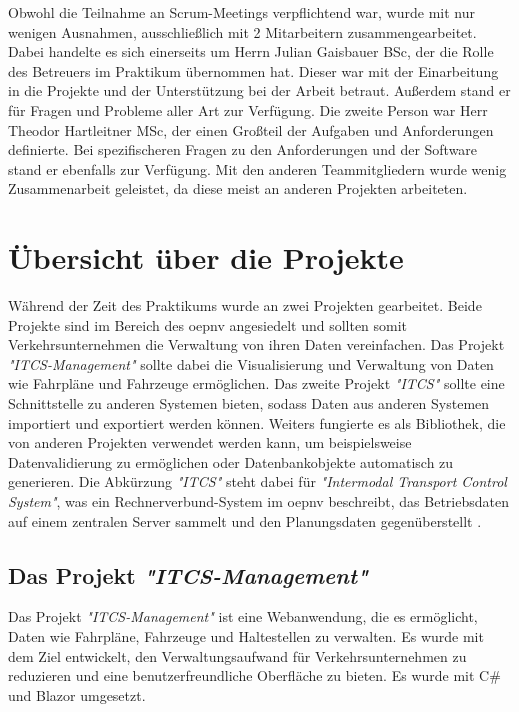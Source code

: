     Obwohl die Teilnahme an Scrum-Meetings verpflichtend war, wurde mit nur wenigen Ausnahmen, ausschließlich mit 2 Mitarbeitern zusammengearbeitet. Dabei handelte es sich einerseits um Herrn Julian Gaisbauer 
    BSc, der die Rolle des Betreuers im Praktikum übernommen hat. Dieser war mit der Einarbeitung in die Projekte und der Unterstützung bei der Arbeit betraut. Außerdem stand er für 
    Fragen und Probleme aller Art zur Verfügung. Die zweite Person war Herr Theodor Hartleitner MSc, der einen Großteil der Aufgaben und Anforderungen definierte. Bei spezifischeren 
    Fragen zu den Anforderungen und der Software stand er ebenfalls zur Verfügung. Mit den anderen Teammitgliedern wurde wenig Zusammenarbeit geleistet, da diese meist an anderen Projekten arbeiteten.


\section{Übersicht über die Projekte}\label{sec:ueberblick-projekte}
    Während der Zeit des Praktikums wurde an zwei Projekten gearbeitet. Beide Projekte sind im Bereich des \gls{oepnv} angesiedelt und sollten somit Verkehrsunternehmen die Verwaltung von ihren Daten 
    vereinfachen. Das Projekt \emph{"ITCS-Management"} sollte dabei die Visualisierung und Verwaltung von Daten wie Fahrpläne und Fahrzeuge ermöglichen. Das zweite Projekt 
    \emph{"ITCS"} sollte eine Schnittstelle zu anderen Systemen bieten, sodass Daten aus anderen Systemen importiert und exportiert werden können. Weiters fungierte es als Bibliothek, 
    die von anderen Projekten verwendet werden kann, um beispielsweise Datenvalidierung zu ermöglichen oder Datenbankobjekte automatisch zu generieren. Die Abkürzung \emph{"ITCS"} steht dabei für
    \emph{"Intermodal Transport Control System"}, was ein Rechnerverbund-System im \gls{oepnv} beschreibt, das Betriebsdaten auf einem zentralen Server sammelt und den Planungsdaten gegenüberstellt \cite{itcs}.
    
\subsection{Das Projekt \emph{"ITCS-Management"}}\label{sec:itcs-management}
    Das Projekt \emph{"ITCS-Management"} ist eine Webanwendung, die es ermöglicht, Daten wie Fahrpläne, Fahrzeuge und Haltestellen zu verwalten. Es wurde mit dem Ziel entwickelt, den 
    Verwaltungsaufwand für Verkehrsunternehmen zu reduzieren und eine benutzerfreundliche Oberfläche zu bieten. Es wurde mit C\# und Blazor umgesetzt. 
    
